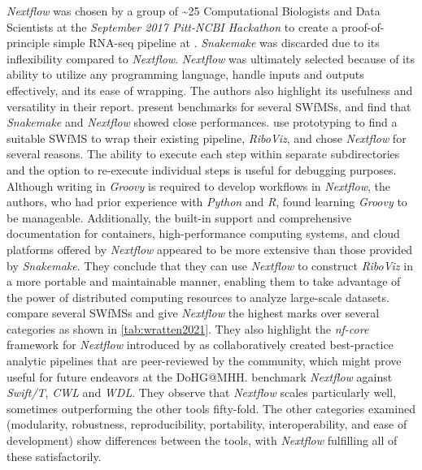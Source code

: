 \textit{Nextflow} was chosen by a group of \~{}25 Computational Biologists and Data Scientists at the \textit{September 2017 Pitt-NCBI Hackathon} to create a proof-of-principle simple RNA-seq pipeline at \autocite{poholek2017}. \textit{Snakemake} was discarded due to its inflexibility compared to \textit{Nextflow}. \textit{Nextflow} was ultimately selected because of its ability to utilize any programming language, handle inputs and outputs effectively, and its ease of wrapping. The authors also highlight its usefulness and versatility in their report. \citeauthor{larsonneur2018} \autocite{larsonneur2018} present benchmarks for several \acp{SWfMS}, and find that \textit{Snakemake} and \textit{Nextflow} showed close performances. \citeauthor{jackson2021} \autocite{jackson2021} use prototyping to find a suitable \ac{SWfMS} to wrap their existing pipeline, \textit{RiboViz}, and chose \textit{Nextflow} for several reasons. The ability to execute each step within separate subdirectories and the option to re-execute individual steps is useful for debugging purposes. Although writing in \textit{Groovy} is required to develop workflows in \textit{Nextflow}, the authors, who had prior experience with \textit{Python} and \textit{R}, found learning \textit{Groovy} to be manageable. Additionally, the built-in support and comprehensive documentation for containers, high-performance computing systems, and cloud platforms offered by \textit{Nextflow} appeared to be more extensive than those provided by \textit{Snakemake}. They conclude that they can use \textit{Nextflow} to construct \textit{RiboViz} in a more portable and maintainable manner, enabling them to take advantage of the power of distributed computing resources to analyze large-scale datasets. \citeauthor{wratten2021} \autocite{wratten2021} compare several \acp{SWfMS} and give \textit{Nextflow} the highest marks over several categories as shown in \cref{tab:wratten2021}. They also highlight the \textit{nf-core} framework for \textit{Nextflow} introduced by \citeauthor{ewels2020} \autocite{ewels2020} as collaboratively created best-practice analytic pipelines that are peer-reviewed by the community, which might prove useful for future endeavors at the \ac{DoHG@MHH}. \citeauthor{Ahmed2021} \autocite{Ahmed2021} benchmark \textit{Nextflow} against \textit{Swift/T}, \textit{CWL} and \textit{WDL}. They observe that \textit{Nextflow} scales particularly well, sometimes outperforming the other tools fifty-fold. The other categories examined (modularity, robustness, reproducibility, portability, interoperability, and ease of development) show differences between the tools, with \textit{Nextflow} fulfilling all of these satisfactorily.

